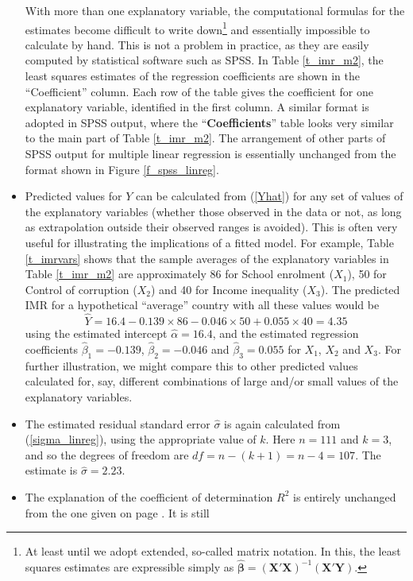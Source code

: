 \begin{itemize}
With more than one explanatory variable, the computational formulas for
the estimates become difficult to write down\footnote{At least until we
adopt extended, so-called matrix notation. In this, the least squares
estimates are expressible simply as $\hat{\boldsymbol{\beta}}=
(\mathbf{X}'\mathbf{X})^{-1}(\mathbf{X}'\mathbf{Y})$.} and essentially
impossible to calculate by hand. This is not a problem in
practice, as they are easily computed by statistical software such as
SPSS. In Table \ref{t_imr_m2}, the least squares estimates of the
regression coefficients are shown in the ``Coefficient'' column. Each
row of the table gives the coefficient for one explanatory variable,
identified in the first column. A similar format is adopted in SPSS
output, where the ``\textbf{Coefficients}'' table looks very similar to the main
part of Table \ref{t_imr_m2}. The arrangement of other parts of SPSS
output for multiple linear regression is essentially unchanged from the
format shown in Figure \ref{f_spss_linreg}.
\item
Predicted values for $Y$ can be calculated from (\ref{Yhat}) for any set
of values of the explanatory variables (whether those observed in the
data or not, as long as extrapolation outside their observed ranges is
avoided). This is often very useful for illustrating the implications of
a fitted model. For example, Table
\ref{t_imrvars} shows that the sample averages of the explanatory
variables in Table \ref{t_imr_m2} are approximately
86 for School enrolment ($X_{1}$),
50 for Control of corruption ($X_{2}$)
and 40 for Income inequality ($X_{3}$). The predicted IMR
for a hypothetical ``average'' country with all these values would
be
\[
\hat{Y}=16.4-0.139\times 86-0.046\times 50+0.055\times 40=4.35
\]
using the estimated intercept $\hat{\alpha}=16.4$, and the estimated
regression coefficients $\hat{\beta}_{1}=-0.139$,
$\hat{\beta}_{2}=-0.046$ and $\hat{\beta}_{3}=0.055$ for $X_{1}$,
$X_{2}$ and $X_{3}$. For further illustration, we might compare this to
other predicted values calculated  for, say,  different combinations of
large and/or small values of the explanatory variables.
\item
The estimated residual standard error $\hat{\sigma}$ is again calculated
from (\ref{sigma_linreg}), using the appropriate value of $k$. Here
$n=111$ and $k=3$, and so the degrees of freedom are
$df=n-(k+1)=n-4=107$. The estimate is $\hat{\sigma}=2.23$.
\item
The explanation of the coefficient of determination $R^{2}$ is entirely
unchanged from the one given on page \pageref{p_R2}. It is still

\end{itemize}
